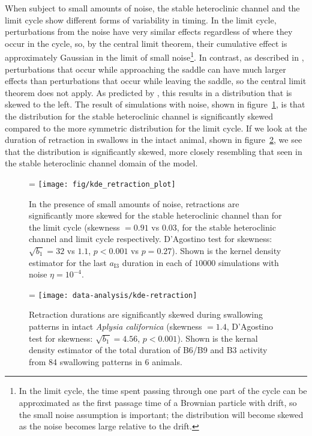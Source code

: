 When subject to small amounts of noise, the stable heteroclinic channel and the
limit cycle show different forms of variability in timing.  In the limit cycle,
perturbations from the noise have very similar effects regardless of where they
occur in the cycle, so, by the central limit theorem, their cumulative effect
is approximately Gaussian in the limit of
small noise\footnote{In the limit cycle, the time spent passing through one
part of the cycle can be approximated as the first passage time of a
Brownian particle with drift, so the small noise assumption is important;
the distribution will become skewed as the noise becomes large relative to
the drift.}.  In contrast, as described in \citet{shaw_phase_2012},
perturbations that occur while approaching the saddle can have much larger
effects than perturbations that occur while leaving the saddle, so the central
limit theorem does not apply.  As predicted by \citet{stone_random_1990}, this
results in a distribution that is skewed to the left.  The result of
simulations with noise, shown in figure~\ref{fig:kde_retraction_model}, is that
the distribution for the stable heteroclinic channel is significantly skewed compared to the more
symmetric distribution for the limit cycle.  If we look at the duration of retraction
in swallows in the intact animal, shown in
figure~\ref{fig:kde_retraction_invivo}, we see that the distribution is
significantly skewed, more closely resembling that seen in the stable heteroclinic channel domain of
the model.

\begin{figure}
    \ifthesis
        \linewidth
    \else
        \figwidth=\linewidth
    \fi
    \centering
    \texttt{[image: fig/kde\_retraction\_plot]}
    \caption[Skewness of retraction duration in simulations]{
    In the presence of small amounts of noise, retractions are
    significantly more skewed for the stable heteroclinic channel than for the limit cycle (skewness $= 0.91$
    vs $0.03$, for the stable heteroclinic channel and limit cycle respectively.  D'Agostino
    test for skewness\citep{dagostino_suggestion_1990}: $\sqrt{b_1} = 32$ vs
    $1.1$, $p < 0.001$ vs $p = 0.27$).  Shown is the kernel density estimator
    for the last $a_\textrm{I3}$ duration in each of $10000$ simulations with
    noise $\eta =
    10^{-4}$.}
    \label{fig:kde_retraction_model}
\end{figure}

\begin{figure}
    \ifthesis
        \linewidth
    \else
        \figwidth=\linewidth
    \fi
    \centering
    \texttt{[image: data-analysis/kde-retraction]}
    \caption[Skewness of retraction duration \textit{in vivo}]{
        Retraction durations are significantly skewed during swallowing
        patterns in intact \textit{Aplysia californica} (skewness $= 1.4$,
        D'Agostino test for skewness\citep{dagostino_suggestion_1990}:
        $\sqrt{b_1} = 4.56$, $p < 0.001$).  Shown is the kernal density
        estimator of the total duration of B6/B9 and B3 activity from 84
        swallowing patterns in 6 animals.}
    \label{fig:kde_retraction_invivo}
\end{figure}

